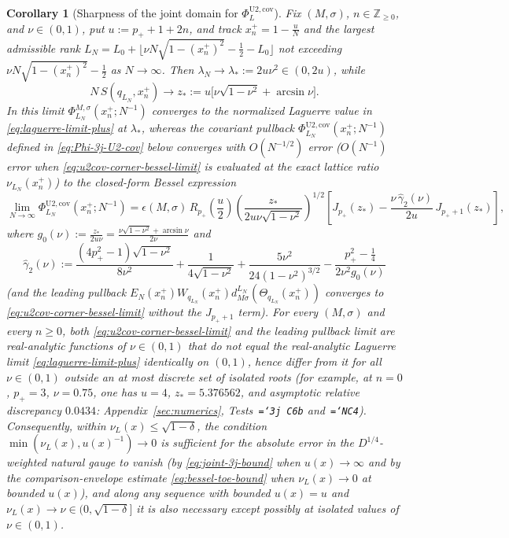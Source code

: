\documentclass[11pt]{article}
\newtheorem{corollary}[theorem]{Corollary}
\theoremstyle{definition}
\theoremstyle{remark}
\renewcommand{\_}{\oldunderscore\penalty0\hskip0pt\relax}
\let\oldtexttt\texttt
\renewcommand{\texttt}[1]{\oldtexttt{\hyphenchar\font=`\-\relax #1}}
\begin{document}
\begin{corollary}[Sharpness of the joint domain for $\Phi_L^{\mathrm{U2,cov}}$]
\label{cor:sharpness}
Fix $(M,\sigma)$, $n\in\mathbb{Z}_{\ge 0}$, and $\nu\in(0,1)$, put $u:=p_++1+2n$, and track $x_n^+=1-\frac{u}{N}$ and
  the largest admissible rank $L_N=L_0+\lfloor\nu N\sqrt{1-(x_n^+)^2}-\frac12-L_0\rfloor$ not exceeding $\nu N\sqrt{1-(x_n^+)^2}-\frac12$ as $N\to\infty$. Then $\lambda_N\to\lambda_*:=2u\nu^2\in(0,2u)$, while
\begin{equation}
  N\,S(q_{L_N},x_n^+) \longrightarrow z_* := u\bigl[\nu\sqrt{1-\nu^2} + \arcsin\nu\bigr].
  \label{eq:z-star-limit}
\end{equation}
In this limit $\Phi_{L_N}^{M,\sigma}(x_n^+;N^{-1})$ converges to the normalized Laguerre value in \eqref{eq:laguerre-limit-plus}
  at $\lambda_*$, whereas the covariant pullback $\Phi_{L_N}^{\mathrm{U2,cov}}(x_n^+;N^{-1})$ defined in \eqref{eq:Phi-3j-U2-cov}
  below converges with $O(N^{-1/2})$ error ($O(N^{-1})$ error when \eqref{eq:u2cov-corner-bessel-limit} is evaluated at the exact
  lattice ratio $\nu_{L_N}(x_n^+)$) to the closed-form Bessel expression
\begin{equation}
  \lim_{N\to\infty}\Phi_{L_N}^{\mathrm{U2,cov}}(x_n^+;N^{-1}) =
    \epsilon(M,\sigma)\,R_{p_+}\!\left(\frac{u}{2}\right)\left(\frac{z_*}{2u\nu\sqrt{1-\nu^2}}\right)^{1/2}\left[J_{p_+}(z_*) -
    \frac{\nu\,\widehat{\gamma}_2(\nu)}{2u}\,J_{p_++1}(z_*)\right],
  \label{eq:u2cov-corner-bessel-limit}
\end{equation}
where $g_0(\nu):=\frac{z_*}{2u\nu}=\frac{\nu\sqrt{1-\nu^2}+\arcsin\nu}{2\nu}$ and
\begin{equation}
  \widehat{\gamma}_2(\nu) := \frac{(4p_+^2-1)\sqrt{1-\nu^2}}{8\nu^2} + \frac{1}{4\sqrt{1-\nu^2}} + \frac{5\nu^2}{24(1-\nu^2)^{3/2}} - \frac{p_+^2-\tfrac14}{2\nu^2 g_0(\nu)}
\end{equation}
(and the leading pullback $E_N(x_n^+)W_{q_{L_N}}(x_n^+)d^{L_N}_{M\sigma}(\Theta_{q_{L_N}}(x_n^+))$ converges to
  \eqref{eq:u2cov-corner-bessel-limit} without the $J_{p_++1}$ term). For every $(M,\sigma)$ and every $n\ge 0$, both
  \eqref{eq:u2cov-corner-bessel-limit} and the leading pullback limit are real-analytic functions of $\nu\in(0,1)$ that do not
  equal the real-analytic Laguerre limit \eqref{eq:laguerre-limit-plus} identically on $(0,1)$, hence differ from it for all
  $\nu\in(0,1)$ outside an at most discrete set of isolated roots (for example, at $n=0$, $p_+=3$, $\nu=0.75$, one has $u=4$,
  $z_*=5.376562$, and asymptotic relative discrepancy $0.0434$: Appendix~\ref{sec:numerics}, Tests~\texttt{3j~C6b}
  and~\texttt{NC4}). Consequently, within $\nu_L(x)\le\sqrt{1-\delta}$, the condition $\min(\nu_L(x),u(x)^{-1})\to 0$ is
  sufficient for the absolute error in the $D^{1/4}$-weighted natural gauge to vanish (by \eqref{eq:joint-3j-bound} when $u(x)\to\infty$
  and by the comparison-envelope estimate \eqref{eq:bessel-toe-bound} when $\nu_L(x)\to0$ at bounded $u(x)$), and along any
  sequence with bounded $u(x)=u$ and $\nu_L(x)\to\nu\in(0,\sqrt{1-\delta}]$ it is also necessary except possibly at isolated
  values of $\nu\in(0,1)$.
\end{corollary}
\end{document}
